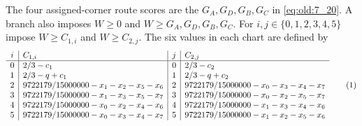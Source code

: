 The four assigned-corner route scores are the $G_A,G_D,G_B,G_C$ in
\eqref{eq:old:7_20}. A branch also imposes $W\ge0$ and
$W\ge G_A,G_D,G_B,G_C$. For $i,j\in\{0,1,2,3,4,5\}$ impose
$W\ge C_{1,i}$ and $W\ge C_{2,j}$. The six values in each chart are
defined by
{\small
\[
\begin{array}{c|l|c|l}
i&C_{1,i}&j&C_{2,j}\\ \hline
0&2/3-c_1&0&2/3-c_2\\
1&2/3-q+c_1&1&2/3-q+c_2\\
2&9722179/15000000-x_1-x_2-x_5-x_6&2&9722179/15000000-x_0-x_3-x_4-x_7\\
3&9722179/15000000-x_1-x_3-x_5-x_7&3&9722179/15000000-x_0-x_2-x_5-x_7\\
4&9722179/15000000-x_0-x_2-x_4-x_6&4&9722179/15000000-x_1-x_3-x_4-x_6\\
5&9722179/15000000-x_0-x_3-x_4-x_7&5&9722179/15000000-x_1-x_2-x_5-x_6
\end{array}
\AutoTag{eq:old:D_7}
\]
}
